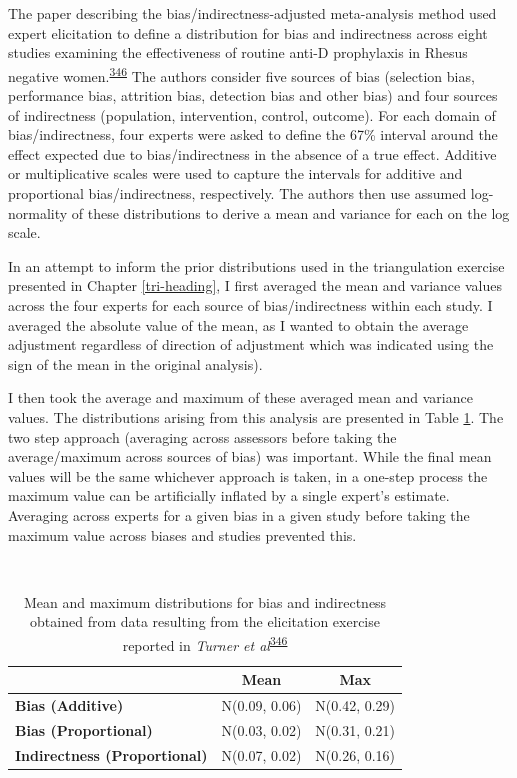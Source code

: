 \documentclass[a4paper, twoside]{templates/ociamthesis}
\begin{document}
The paper describing the bias/indirectness-adjusted meta-analysis method used expert elicitation to define a distribution for bias and indirectness across eight studies examining the effectiveness of routine anti-D prophylaxis in Rhesus negative women.\textsuperscript{\protect\hyperlink{ref-turner2009}{346}} The authors consider five sources of bias (selection bias, performance bias, attrition bias, detection bias and other bias) and four sources of indirectness (population, intervention, control, outcome). For each domain of bias/indirectness, four experts were asked to define the 67\% interval around the effect expected due to bias/indirectness in the absence of a true effect. Additive or multiplicative scales were used to capture the intervals for additive and proportional bias/indirectness, respectively. The authors then use assumed log-normality of these distributions to derive a mean and variance for each on the log scale.

In an attempt to inform the prior distributions used in the triangulation exercise presented in Chapter \ref{tri-heading}, I first averaged the mean and variance values across the four experts for each source of bias/indirectness within each study. I averaged the absolute value of the mean, as I wanted to obtain the average adjustment regardless of direction of adjustment which was indicated using the sign of the mean in the original analysis).

I then took the average and maximum of these averaged mean and variance values. The distributions arising from this analysis are presented in Table \ref{tab:turnerEstimates-table}. The two step approach (averaging across assessors before taking the average/maximum across sources of bias) was important. While the final mean values will be the same whichever approach is taken, in a one-step process the maximum value can be artificially inflated by a single expert's estimate. Averaging across experts for a given bias in a given study before taking the maximum value across biases and studies prevented this.

~





\begin{table}[H]

\caption[turnerEstimates]{\label{tab:turnerEstimates-table}Mean and maximum distributions for bias and indirectness obtained from data resulting from the elicitation exercise reported in \emph{Turner et al}\textsuperscript{\protect\hyperlink{ref-turner2009}{346}}}
\centering
\begin{tabular}[t]{>{}lcc}
\toprule
\textbf{ } & \textbf{Mean} & \textbf{Max}\\
\midrule
\textbf{Bias (Additive)} & N(0.09, 0.06) & N(0.42, 0.29)\\
\textbf{Bias (Proportional)} & N(0.03, 0.02) & N(0.31, 0.21)\\
\textbf{Indirectness (Proportional)} & N(0.07, 0.02) & N(0.26, 0.16)\\
\bottomrule
\end{tabular}
\end{table}
\end{document}
